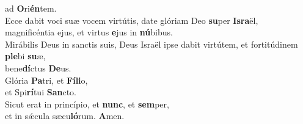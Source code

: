 \evenverse ad \textbf{O}ri\textbf{én}tem.\\
\oddverse Ecce dabit voci suæ vocem virtútis, date glóriam Deo \textbf{su}per \textbf{Is}\textbf{ra}ël,~\*\\
\oddverse magnificéntia ejus, et virtus \textbf{e}jus in \textbf{nú}bibus.\\
\evenverse Mirábilis Deus in sanctis suis, Deus Israël ipse dabit virtútem, et fortitúdinem \textbf{ple}bi \textbf{su}æ,~\*\\
\evenverse bene\textbf{dí}ctus \textbf{De}us.\\
\oddverse Glória \textbf{Pa}tri, et \textbf{Fí}\textbf{li}o,~\*\\
\oddverse et Spi\textbf{rí}tui \textbf{San}cto.\\
\evenverse Sicut erat in princípio, et \textbf{nunc}, et \textbf{sem}per,~\*\\
\evenverse et in sǽcula sæcu\textbf{ló}rum. \textbf{A}men.\\
